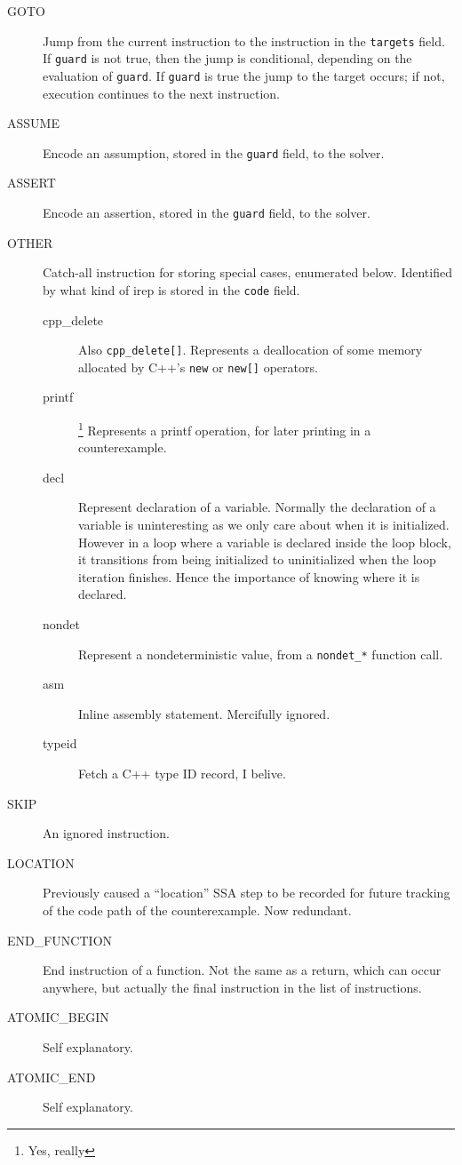 \documentclass{article}
\begin{document}
\begin{description}
\item[GOTO] Jump from the current instruction to the instruction in the
\texttt{targets} field. If \texttt{guard} is not true, then the jump is
conditional, depending on the evaluation of \texttt{guard}. If \texttt{guard}
is true the jump to the target occurs; if not, execution continues to the next
instruction.
\item[ASSUME] Encode an assumption, stored in the \texttt{guard} field, to the
solver.
\item[ASSERT] Encode an assertion, stored in the \texttt{guard} field, to the
solver.
\item[OTHER] Catch-all instruction for storing special cases, enumerated below.
Identified by what kind of irep is stored in the \texttt{code} field.
\begin{description}
\item[cpp\_delete] Also \texttt{cpp\_delete[]}. Represents a deallocation of
some memory allocated by C++'s \texttt{new} or \texttt{new[]} operators.
\item[printf]\footnote{Yes, really} Represents a printf operation, for later
printing in a counterexample.
\item[decl] Represent declaration of a variable. Normally the declaration of
a variable is uninteresting as we only care about when it is initialized.
However in a loop where a variable is declared inside the loop block, it
transitions from being initialized to uninitialized when the loop iteration
finishes. Hence the importance of knowing where it is declared.
\item[nondet] Represent a nondeterministic value, from a \texttt{nondet\_*}
function call.
\item[asm] Inline assembly statement. Mercifully ignored.
\item[typeid] Fetch a C++ type ID record, I belive.
\end{description}
\item[SKIP] An ignored instruction.
\item[LOCATION] Previously caused a ``location'' SSA step to be recorded for
future tracking of the code path of the counterexample. Now redundant.
\item[END\_FUNCTION] End instruction of a function. Not the same as a return,
which can occur anywhere, but actually the final instruction in the list of
instructions.
\item[ATOMIC\_BEGIN] Self explanatory.
\item[ATOMIC\_END] Self explanatory.

\end{description}
\end{document}
